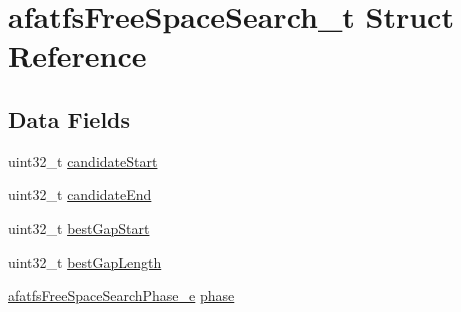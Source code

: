 \hypertarget{structafatfsFreeSpaceSearch__t}{\section{afatfs\+Free\+Space\+Search\+\_\+t Struct Reference}
\label{structafatfsFreeSpaceSearch__t}
}
\subsection*{Data Fields}
\begin{DoxyCompactItemize}
\item 
uint32\+\_\+t \hyperlink{structafatfsFreeSpaceSearch__t_a3df326f91542937eaf24b320642803c1}{candidate\+Start}
\item 
uint32\+\_\+t \hyperlink{structafatfsFreeSpaceSearch__t_ab899a685570cece100b5612831576887}{candidate\+End}
\item 
uint32\+\_\+t \hyperlink{structafatfsFreeSpaceSearch__t_a0c31b18e24b49ef4e12435d11e0a82a5}{best\+Gap\+Start}
\item 
uint32\+\_\+t \hyperlink{structafatfsFreeSpaceSearch__t_a87ca3fe7c2256b89e064898caa3a55f7}{best\+Gap\+Length}
\item 
\hyperlink{asyncfatfs_8c_ad12a36a8500bb4882dbbd192e60a06a5}{afatfs\+Free\+Space\+Search\+Phase\+\_\+e} \hyperlink{structafatfsFreeSpaceSearch__t_a87133484f9dd0fa70bf8d513d7a901c3}{phase}
\end{DoxyCompactItemize}


